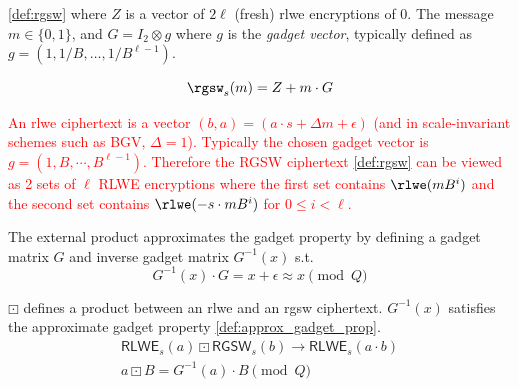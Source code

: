 \begin{definition} \eqref{def:rgsw} where $Z$ is a vector of $2\ell$ (fresh) \gls{rlwe} %
encryptions of 0. The message $m\in \{0,1\}$, and $G = I_2\otimes g$ where $g$ is the \textit{gadget vector}, typically defined as $g=(1, 1/B, \dots, 1/B^{\ell-1})$. 

\begin{equation}
    \label{def:rgsw}
    \rgsw_s(m) = Z + m\cdot G
\end{equation}
\end{definition}

\ifnotes
    \textcolor{red}{An \gls{rlwe} ciphertext is a vector $(b,a) = (a\cdot s + \Delta m + \epsilon)$ (and in scale-invariant schemes such as BGV, $\Delta = 1$). Typically the chosen gadget vector is $g = (1, B, \cdots, B^{\ell - 1})$. Therefore the RGSW ciphertext \eqref{def:rgsw} can be viewed as 2 sets of $\ell$ RLWE encryptions where the first set contains $\rlwe(mB^i)$ and the second set contains $\rlwe(-s\cdot mB^i)$ for $0 \leq i < \ell$.}
\fi


The external product approximates the gadget property by defining a gadget matrix $G$ and inverse gadget matrix $G^{-1}(x)$ s.t.
\begin{equation}
    \label{def:approx_gadget_prop}
    G^{-1}(x)\cdot G = x + \epsilon \approx x \pmod{Q}
\end{equation}

\begin{definition} $\boxdot$ defines a product between an \gls{rlwe} and an \gls{rgsw} ciphertext. $G^{-1}(x)$ satisfies the approximate gadget property \eqref{def:approx_gadget_prop}.
\begin{gather}
    \label{def:external_product}
    \mathsf{RLWE}_s(a) \boxdot \mathsf{RGSW}_s(b) \to \mathsf{RLWE}_s(a\cdot b)
    \\ a\boxdot B = G^{-1}(a)\cdot B \pmod{Q} 
\end{gather}
\end{definition}

